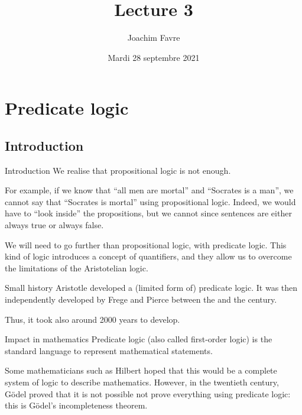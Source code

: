 \documentclass{article}
\title{Lecture 3}
\author{Joachim Favre}
\date{Mardi 28 septembre 2021}
\begin{document}
\maketitle


\section{Predicate logic}
\subsection{Introduction}

\begin{parag}{Introduction}
    We realise that propositional logic is not enough.

    For example, if we know that ``all men are mortal'' and ``Socrates is a man'', we cannot say that ``Socrates is mortal'' using propositional logic. Indeed, we would have to ``look inside'' the propositions, but we cannot since sentences are either always true or always false.

    We will need to go further than propositional logic, with predicate logic. This kind of logic introduces a concept of quantifiers, and they allow us to overcome the limitations of the Aristotelian logic.
\end{parag}

\begin{parag}{Small history}
    Aristotle developed a (limited form of) predicate logic. It was then independently developed by Frege and Pierce between the  and the  century.

    Thus, it took also around 2000 years to develop.
\end{parag}

\begin{parag}{Impact in mathematics}
    Predicate logic (also called first-order logic) is the standard language to represent mathematical statements.

    Some mathematicians such as Hilbert hoped that this would be a complete system of logic to describe mathematics. However, in the twentieth century, Gödel proved that it is not possible not prove everything using predicate logic: this is Gödel's incompleteness theorem.
\end{parag}
\end{document}
